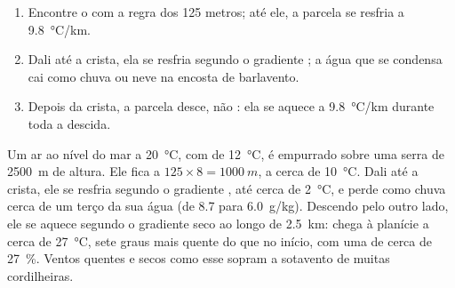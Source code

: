 \begin{method}\label{met:g10:why-clouds-form:mountain}
\begin{enumerate}
  \item Encontre o  com a regra dos 125 metros; até ele,
        a parcela se resfria a \qty{9.8}{\degreeCelsius/km}.
  \item Dali até a crista, ela se resfria segundo o gradiente ; a
        água que se condensa cai como chuva ou neve na encosta de
        barlavento.
  \item Depois da crista, a parcela desce, não : ela se aquece a
        \qty{9.8}{\degreeCelsius/km} durante toda a descida.
\end{enumerate}
\end{method}

\begin{example}\label{ex:g10:why-clouds-form:lee}
Um ar ao nível do mar a \qty{20}{\degreeCelsius}, com  de
\qty{12}{\degreeCelsius}, é empurrado sobre uma serra de \qty{2500}{m} de
altura. Ele fica  a $125 \times 8 = \qty{1000}{m}$, a cerca de
\qty{10}{\degreeCelsius}. Dali até a crista, ele se resfria segundo o
gradiente , até cerca de \qty{2}{\degreeCelsius}, e perde como chuva
cerca de um terço da sua água (de \num{8.7} para \qty{6.0}{g/kg}). Descendo
pelo outro lado, ele se aquece segundo o gradiente seco ao longo de
\qty{2.5}{km}: chega à planície a cerca de \qty{27}{\degreeCelsius}, sete
graus mais quente do que no início, com uma  de cerca de
\qty{27}{\percent}. Ventos quentes e secos como esse sopram a sotavento de
muitas cordilheiras.
\end{example}

